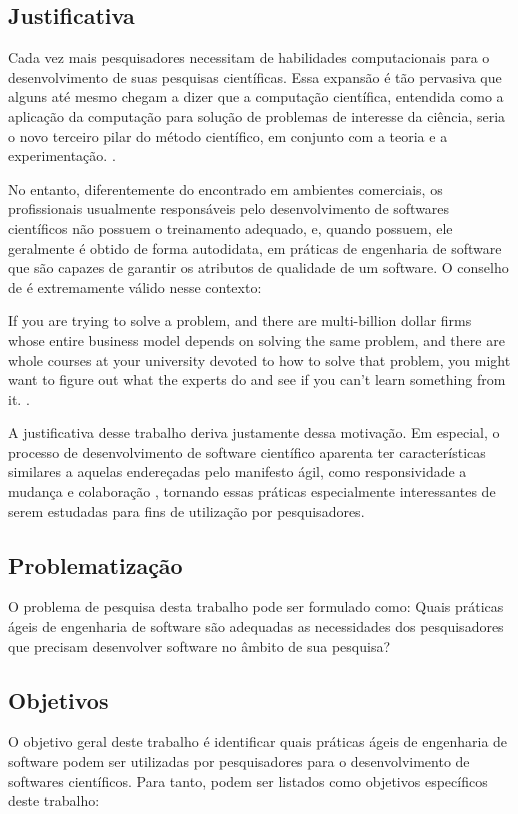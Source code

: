 \documentclass[
	article,			%
	11pt,				%
	oneside,			%
	a4paper,			%
	english,			%
	brazil,				%
	sumario=tradicional
	]{abntex2}
\begin{document}
\subsection*{Justificativa}
Cada vez mais pesquisadores necessitam de habilidades computacionais para o desenvolvimento de suas pesquisas científicas. Essa expansão é tão pervasiva que alguns até mesmo chegam a dizer que a computação científica, entendida como a aplicação da computação para solução de problemas de interesse da ciência, seria o novo terceiro pilar do método científico, em conjunto com a teoria e a experimentação. \cite{pitac2005}.

No entanto, diferentemente do encontrado em ambientes comerciais, os profissionais usualmente responsáveis pelo desenvolvimento de softwares científicos não possuem o treinamento adequado, e, quando possuem, ele geralmente é obtido de forma autodidata, em práticas de engenharia de software que são capazes de garantir os atributos de qualidade de um software. O conselho de  é extremamente válido nesse contexto:  

\begin{citacao}
If you are trying to solve a problem, and there are multi-billion dollar firms whose entire business model depends on solving the same problem, and there are whole courses at your university devoted to how to solve that problem, you might want to figure out what the experts do and see if you can’t learn something from it. \cite[pg. 5]{gentzkow2014}.
\end{citacao}

A justificativa desse trabalho deriva justamente dessa motivação. Em especial, o processo de desenvolvimento de software científico aparenta ter características similares a aquelas endereçadas pelo manifesto ágil, como responsividade a mudança e colaboração \cite{sletholt2012}, tornando essas práticas especialmente interessantes de serem estudadas para fins de utilização por pesquisadores.

\subsection*{Problematização}
O problema de pesquisa desta trabalho pode ser formulado como: Quais práticas ágeis de engenharia de software são adequadas as necessidades dos pesquisadores que precisam desenvolver software no âmbito de sua pesquisa?

\subsection*{Objetivos}
O objetivo geral deste trabalho é identificar quais práticas ágeis de engenharia de software podem ser utilizadas por pesquisadores para o desenvolvimento de softwares científicos. Para tanto, podem ser listados como objetivos específicos deste trabalho:
\end{document}
